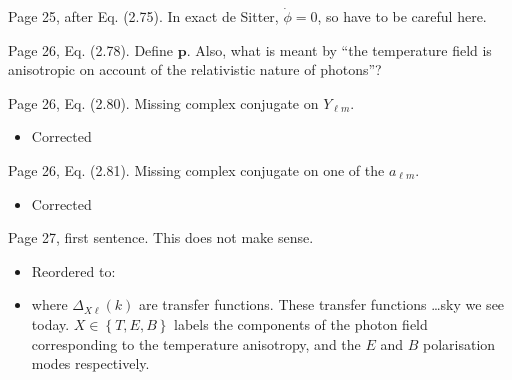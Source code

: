 \documentclass[11pt]{article}
\newcommand{\todo}[1]{{\color{red} #1}}
\begin{document}
\begin{enumerate}
  \todo{
\item Page 25, after Eq. (2.75). In exact de Sitter, $\dot{\phi} = 0$,
  so have to be careful here.
}
\todo{
\item Page 26, Eq. (2.78). Define $\mathbf{p}$. Also, what is meant by
  ``the temperature field is anisotropic on account of the
  relativistic nature of photons''?
}
\item Page 26, Eq. (2.80). Missing complex conjugate on $Y_{\ell m}$.
  \begin{itemize}
    \item Corrected
  \end{itemize}
\item Page 26, Eq. (2.81). Missing complex conjugate on one of the
  $a_{\ell m}$.
  \begin{itemize}
    \item Corrected
  \end{itemize}
\item Page 27, first sentence. This does not make sense.
  \begin{itemize}
    \item Reordered to:
    \item where \(\Delta_{X\ell}(k)\) are transfer functions. These transfer functions \ldots  sky we see today. 
 \({X\in\left\{ T,E,B \right\}}\) labels the components of the photon field corresponding to the temperature anisotropy, and the \(E\) and \(B\) polarisation modes respectively.
  \end{itemize}
\end{enumerate}
\end{document}
